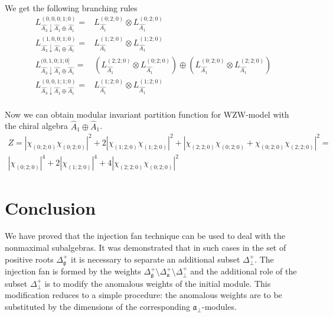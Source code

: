 \documentclass[a4paper,12pt]{article}
\theoremstyle{definition} \newtheorem{Def}{Definition}
\begin{document}
 We get the following branching rules
 \begin{equation}
   \label{eq:39}
   \begin{array}{ll}
     L^{(0,0,0;1;0)}_{\hat{A_3}\downarrow \hat{A_1}\oplus \hat{A_1}}= & L_{\hat{A_1}}^{(0;2;0)}\otimes L_{\hat{A_1}}^{(0;2;0)} \\
     L^{(1,0,0;1;0)}_{\hat{A_3}\downarrow \hat{A_1}\oplus \hat{A_1}}= & L_{\hat{A_1}}^{(1;2;0)}\otimes L_{\hat{A_1}}^{(1;2;0)} \\
     L^{(0,1,0;1;0]}_{\hat{A_3}\downarrow \hat{A_1}\oplus \hat{A_1}}= & \left( L_{\hat{A_1}}^{(2;2;0)}\otimes L_{\hat{A_1}}^{(0;2;0)}\right) \oplus \left( L_{\hat{A_1}}^{(0;2;0)}\otimes L_{\hat{A_1}}^{(2;2;0)}\right) \\
     L^{(0,0,1;1;0)}_{\hat{A_3}\downarrow \hat{A_1}\oplus \hat{A_1}}= & L_{\hat{A_1}}^{(1;2;0)}\otimes L_{\hat{A_1}}^{(1;2;0)} \\     
   \end{array}
 \end{equation}

Now we can obtain modular invariant partition function for WZW-model with the chiral algebra $\hat{A}_1\oplus \hat{A}_1$.
\begin{multline}
  \label{eq:40}
  Z=\left|\chi_{(0;2;0)}\chi_{(0;2;0)}\right|^2+2\left|\chi_{(1;2;0)}\chi_{(1;2;0)}\right|^2+ \left|\chi_{(2;2;0)}\chi_{(0;2;0)}+\chi_{(0;2;0)}\chi_{(2;2;0)}\right|^2=\\
  \left|\chi_{(0;2;0)}\right|^4+2\left|\chi_{(1;2;0)}\right|^4+ 4\left|\chi_{(2;2;0)}\chi_{(0;2;0)}\right|^2
\end{multline}

\section{Conclusion}
\label{sec:conclusion}
We have proved that the injection fan technique can be used to deal with the nonmaximal subalgebras. It was demonstrated that in such cases in the set of positive roots $\Delta_{\mathfrak{g}}^{+}$ it is necessary to  separate an additional subset $\Delta^{+}_{\bot}$. The injection fan is formed by the weights $\Delta_{\mathfrak{g}}^{+} \setminus  \Delta_{\mathfrak{a}}^{+} \setminus \Delta^{+}_{\bot}$ and the additional role of the subset $\Delta^{+}_{\bot}$ is to modify the anomalous weights of the initial module. This modification reduces to a simple procedure: the anomalous weights are to be substituted by the dimensions of the corresponding ${\mathfrak{a}}_{\bot}$-modules.      
 
\end{document}
